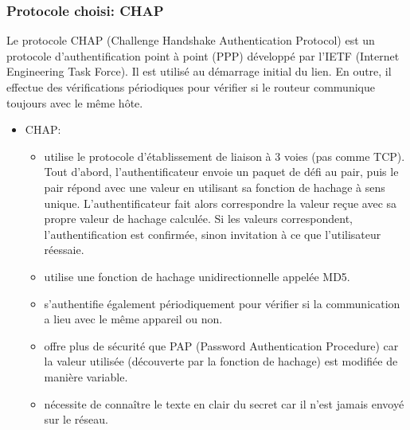 \documentclass[
  french,
  paper=a4,
  ,captions=tableheading
]{scrartcl}
\providecommand{\tightlist}{%
  \setlength{\itemsep}{0pt}\setlength{\parskip}{0pt}}
\begin{document}
\hypertarget{protocole-choisi-chap}{%
\subsubsection{Protocole choisi: CHAP}\label{protocole-choisi-chap}}

Le protocole CHAP (Challenge Handshake Authentication Protocol) est un
protocole d'authentification point à point (PPP) développé par l'IETF
(Internet Engineering Task Force). Il est utilisé au démarrage initial
du lien. En outre, il effectue des vérifications périodiques pour
vérifier si le routeur communique toujours avec le même hôte.

\begin{itemize}
\tightlist
\item
  CHAP:

  \begin{itemize}
  \tightlist
  \item
    utilise le protocole d'établissement de liaison à 3 voies (pas comme
    TCP). Tout d'abord, l'authentificateur envoie un paquet de défi au
    pair, puis le pair répond avec une valeur en utilisant sa fonction
    de hachage à sens unique. L'authentificateur fait alors correspondre
    la valeur reçue avec sa propre valeur de hachage calculée. Si les
    valeurs correspondent, l'authentification est confirmée, sinon
    invitation à ce que l'utilisateur réessaie.
  \item
    utilise une fonction de hachage unidirectionnelle appelée MD5.
  \item
    s'authentifie également périodiquement pour vérifier si la
    communication a lieu avec le même appareil ou non.
  \item
    offre plus de sécurité que PAP (Password Authentication Procedure)
    car la valeur utilisée (découverte par la fonction de hachage) est
    modifiée de manière variable.
  \item
    nécessite de connaître le texte en clair du secret car il n'est
    jamais envoyé sur le réseau.
  \end{itemize}
\end{itemize}
\end{document}
